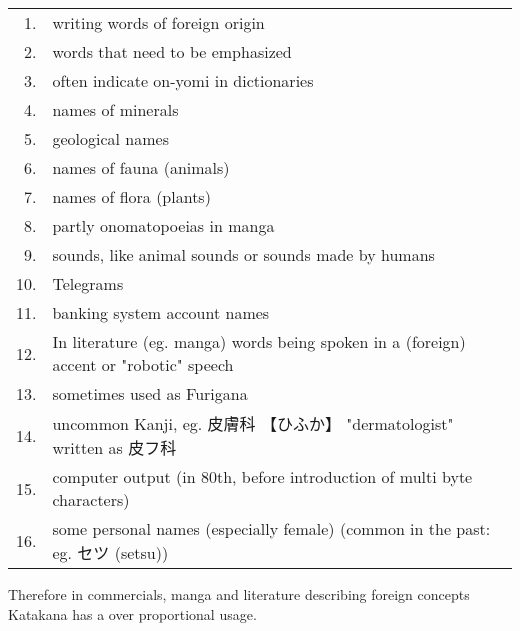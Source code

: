 \begin{tabular}{rp{15cm}}
1.& writing words of foreign origin\\
2.& words that need to be emphasized\\
3. &often indicate on-yomi in dictionaries\\
4.& names of minerals \\
5.& geological names \\
6.& names of fauna (animals)\\
7.& names of flora (plants)\\
8.& partly onomatopoeias in manga\\
9.& sounds, like animal sounds or sounds made by humans\\
10.& Telegrams \\
11.& banking system account names\\
12.& In literature (eg. manga) words being spoken in a (foreign) accent or "robotic" speech\\
13. &sometimes used as Furigana\\
14. & uncommon Kanji, eg.  {皮膚科} {【ひふか】} "dermatologist" written as {皮フ科}\\
15.& computer output (in 80th, before introduction of multi byte characters)\\
16. &some personal names (especially female) (common in the past: eg. セツ (setsu))\\
\end{tabular}

\medskip

Therefore in commercials, manga and literature describing foreign concepts
Katakana has a over proportional usage.



%

